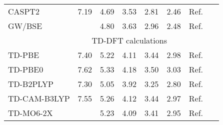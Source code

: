 \documentclass[aip,jcp,reprint,showkeys]{revtex4-1}
\newcommand{\mc}{\multicolumn}
\begin{document}
\begin{table*}
\begin{ruledtabular}
\begin{tabular}{lllllllc}
		CASPT2			&	7.19		&	4.69	&	3.53	&	2.81	&	2.46	&	Ref.~\onlinecite{Send11}	\\
		GW/BSE			&				&	4.80	&	3.63	&	2.96	&	2.48	&	Ref.~\onlinecite{Boulanger14}	\\
		\hline
						&	\mc{5}{c}{TD-DFT calculations}													\\
		TD-PBE			&	7.40		&	5.22		&	4.11		&	3.44		&	2.98		&	Ref.~\onlinecite{Send11}	\\
		TD-PBE0			&	7.62		&	5.33		&	4.18		&	3.50		&	3.03		&	Ref.~\onlinecite{Send11}	\\
		TD-B2PLYP		&	7.30		&	5.05		&	3.92		&	3.25		&	2.80		&	Ref.~\onlinecite{Send11}	\\
		TD-CAM-B3LYP	&	7.55		&	5.26		&	4.12		&	3.44		&	2.97		&	Ref.~\onlinecite{Send11}	\\
		TD-MO6-2X		&				&	5.23		&	4.09		&	3.41		&	2.95		&	Ref.~\onlinecite{Jacquemin12}	\\
	\end{tabular}		
	\end{ruledtabular}		
\end{table*}		
\end{document}
